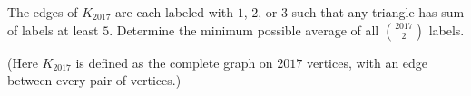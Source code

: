 The edges of $K_{2017}$ are each labeled with $1$, $2$, or $3$ such that any triangle has sum of labels at least $5$. Determine the minimum possible average of all $\binom{2017}{2}$ labels.
 
(Here $K_{2017}$ is defined as the complete graph on $2017$ vertices, with an edge between every pair of vertices.)